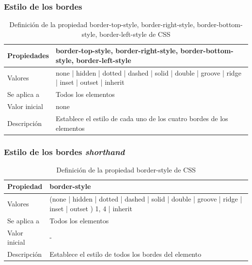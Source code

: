 
\begin{frame}
\frametitle{Estilo de los bordes}

\begin{center}
  \begin{table}
   \begin{tabular}{p{1.8cm}p{7.8cm}}
Propiedades &\bf{border-top-style}, \bf{border-right-style}, \bf{border-bottom-style}, \bf{border-left-style} \\ \hline
Valores & none | hidden | dotted | dashed | solid | double | groove | ridge | inset | outset | inherit \\ \hline
Se aplica a & Todos los elementos \\ \hline
Valor inicial & none \\ \hline
Descripción & Establece el estilo de cada uno de los cuatro bordes de los elementos \\ \hline
  \end{tabular}
   \caption{Definición de la propiedad border-top-style, border-right-style, border-bottom-style, border-left-style de CSS}
 \end{table}
\end{center}

\end{frame}


\begin{frame}
\frametitle{Estilo de los bordes \emph{shorthand}}

\begin{center}
  \begin{table}
   \begin{tabular}{p{1.8cm}p{7.8cm}}
Propiedad &\bf{border-style} \\ \hline
Valores & (none | hidden | dotted | dashed | solid | double | groove | ridge | inset | outset ) {1, 4} | inherit \\ \hline
Se aplica a & Todos los elementos \\ \hline
Valor inicial & - \\ \hline
Descripción & Establece el estilo de todos los bordes del elemento \\ \hline
  \end{tabular}
   \caption{Definición de la propiedad border-style de CSS}
 \end{table}
\end{center}

\end{frame}


